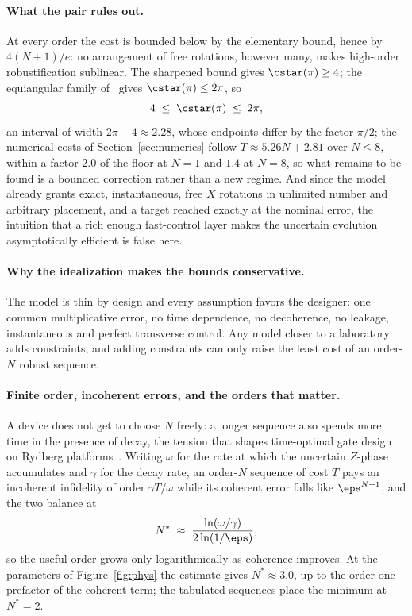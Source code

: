 \paragraph{What the pair rules out.} At every order the cost is bounded below by the
elementary bound, hence by $4(N+1)/e$: no arrangement of free rotations, however many,
makes high-order robustification sublinear. The sharpened bound gives $\cstar(\pi)\ge4$; the equiangular family of~\cite{Low2014} gives $\cstar(\pi)\le2\pi$, so
\begin{equation}
4\;\le\;\cstar(\pi)\;\le\;2\pi ,
\label{eq:window}
\end{equation}
an interval of width $2\pi-4\approx2.28$, whose endpoints differ by the factor $\pi/2$; the numerical costs of
Section~\ref{sec:numerics} follow $T\approx5.26N+2.81$ over $N\le8$, within a factor
$2.0$ of the floor at $N=1$ and $1.4$ at $N=8$, so what remains to be found is a bounded correction rather than a new
regime. And since the model already grants exact, instantaneous, free $X$ rotations in
unlimited number and arbitrary placement, and a target reached exactly at the nominal
error, the intuition that a rich enough fast-control layer makes the uncertain evolution
asymptotically efficient is false here.

\paragraph{Why the idealization makes the bounds conservative.} The model is thin by design and every assumption favors the designer: one common multiplicative error, no time dependence, no decoherence, no leakage, instantaneous and perfect transverse control. Any model closer to a laboratory adds constraints, and adding constraints can only raise the least cost of an order-$N$ robust sequence.

\paragraph{Finite order, incoherent errors, and the orders that matter.} A device does
not get to choose $N$ freely: a longer sequence also spends more time in the presence of
decay, the tension that shapes time-optimal gate design on Rydberg platforms~\cite{Jandura2022}. Writing $\omega$ for the rate at which the uncertain $Z$-phase
accumulates and $\gamma$ for the decay rate, an order-$N$ sequence of cost $T$ pays an
incoherent infidelity of order $\gamma T/\omega$ while its coherent error falls like
$\eps^{N+1}$, and the two balance at
\begin{equation}
N^\ast\;\approx\;\frac{\ln(\omega/\gamma)}{2\ln(1/\eps)},
\label{eq:nstar}
\end{equation}
so the useful order grows only logarithmically as coherence improves. At the parameters of Figure~\ref{fig:phys} the estimate gives $N^\ast\approx3.0$, up to the order-one prefactor of the coherent term; the tabulated sequences place the minimum at $N^\ast=2$.

